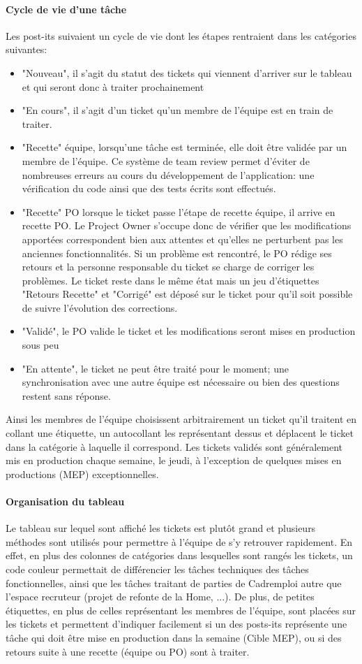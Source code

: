 \paragraph{Cycle de vie d'une tâche}
Les post-its suivaient un cycle de vie dont les étapes rentraient dans les catégories suivantes:
\begin{itemize}
  \item "Nouveau", il s'agit du statut des tickets qui viennent d'arriver sur le tableau et qui seront donc à traiter prochainement
  \item "En cours", il s'agit d'un ticket qu'un membre de l'équipe est en train de traiter.
  \item "Recette" équipe, lorsqu'une tâche est terminée, elle doit être validée par un membre de l'équipe.
  Ce système de team review permet d'éviter de nombreuses erreurs au cours du développement de l'application: une vérification du code ainsi que des tests écrits sont effectués.
  \item "Recette" PO lorsque le ticket passe l'étape de recette équipe, il arrive en recette PO.
  Le Project Owner s'occupe donc de vérifier que les modifications apportées correspondent bien aux attentes et qu'elles ne perturbent pas les anciennes fonctionnalités.
  Si un problème est rencontré, le PO rédige ses retours et la personne responsable du ticket se charge de corriger les problèmes.
  Le ticket reste dans le même état mais un jeu d'étiquettes "Retours Recette" et "Corrigé" est déposé sur le ticket pour qu'il soit possible de suivre l'évolution des corrections.
  \item "Validé", le PO valide le ticket et les modifications seront mises en production sous peu
  \item "En attente", le ticket ne peut être traité pour le moment; une synchronisation avec une autre équipe est nécessaire ou bien des questions restent sans réponse.
\end{itemize}
Ainsi les membres de l'équipe choisissent arbitrairement un ticket qu'il traitent en collant une étiquette, un autocollant les représentant dessus et déplacent le ticket dans la catégorie à laquelle il correspond.
Les tickets validés sont généralement mis en production chaque semaine, le jeudi, à l'exception de quelques mises en productions (MEP) exceptionnelles.
\paragraph{Organisation du tableau}
Le tableau sur lequel sont affiché les tickets est plutôt grand et plusieurs méthodes sont utilisés pour permettre à l'équipe de s'y retrouver rapidement.
En effet, en plus des colonnes de catégories dans lesquelles sont rangés les tickets, un code couleur permettait de différencier les tâches techniques des tâches fonctionnelles, ainsi que les tâches traitant de parties de Cadremploi autre que l'espace recruteur (projet de refonte de la Home, ...).
De plus, de petites étiquettes, en plus de celles représentant les membres de l'équipe, sont placées sur les tickets et permettent d'indiquer facilement si un des posts-its représente une tâche qui doit être mise en production dans la semaine (Cible MEP), ou si des retours suite à une recette (équipe ou PO) sont à traiter.
